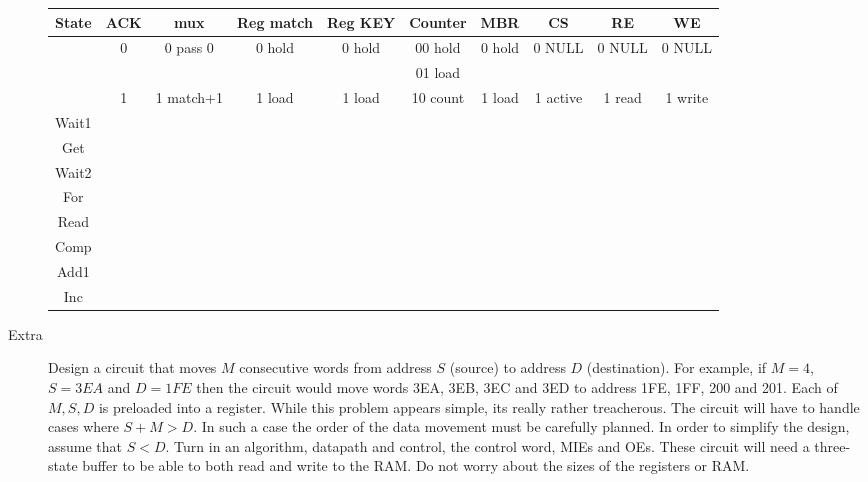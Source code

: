\begin{description}
{\tiny
\begin{tabular}{c||c|c|c|c|c|c|c|c|c}  
State   & ACK   & mux       &  Reg match& Reg KEY & Counter     & MBR    & CS       & RE     & WE       \\ \hline
        & 0     & 0 pass 0  &  0 hold   & 0 hold  & 00 hold     & 0 hold & 0 NULL   & 0 NULL & 0 NULL   \\ \hline
        &       &           &           &         & 01 load     &        &          &        &          \\ \hline
        & 1     & 1 match+1 &  1 load   & 1 load  & 10 count    & 1 load & 1 active & 1 read & 1 write  \\ \hline \hline
Wait1   &      &          &          &        &           &       &         &       &          \\ \hline
Get     &      &          &          &        &           &       &         &       &          \\ \hline
Wait2   &      &          &          &        &           &       &         &       &          \\ \hline
For     &      &          &          &        &           &       &         &       &          \\ \hline
Read    &      &          &          &        &           &       &         &       &          \\ \hline
Comp    &      &          &          &        &           &       &         &       &          \\ \hline
Add1    &      &          &          &        &           &       &         &       &          \\ \hline
Inc     &      &          &          &        &           &       &         &       &          \\ 
\end{tabular} }

\pagebreak

\item [Extra]
Design a circuit that moves $M$ consecutive words from address $S$ (source) to
address $D$ (destination).  For example, if $M=4$, $S=3EA$ and $D=1FE$ then the
circuit would move words 3EA, 3EB, 3EC and 3ED to address 1FE, 1FF, 200 and 201.
Each of $M,S,D$ is preloaded into a register.  While this problem appears simple,
its really rather treacherous.  The circuit will have to handle cases where
$S+M > D$.  In such a case the order of the data movement must be carefully planned.
In order to simplify the design, assume that $S<D$.  Turn in an algorithm,
datapath and control, the
control word, MIEs and OEs.  These circuit will need a three-state buffer to
be able to both read and write to the RAM.  Do not worry about the sizes of the
registers or RAM.


\end{description}

